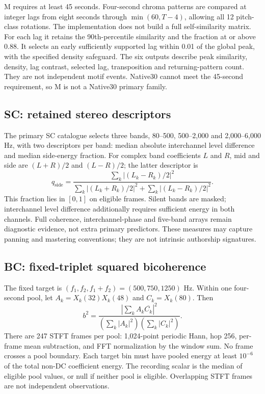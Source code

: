 M requires at least 45 seconds. Four-second chroma patterns are compared
at integer lags from eight seconds through
$\min(60,T-4)$, allowing all 12 pitch-class rotations. The implementation
does not build a full self-similarity matrix. For each lag it retains the
90th-percentile similarity and the fraction at or above 0.88. It selects
an early sufficiently supported lag within 0.01 of the global peak, with
the specified density safeguard. The six outputs describe peak similarity,
density, lag contrast, selected lag, transposition and returning-pattern
count. They are not independent motif events. Native30 cannot meet the
45-second requirement, so M is not a Native30 primary family.

\subsection{SC: retained stereo descriptors}
The primary SC catalogue selects three bands, 80--500, 500--2,000 and
2,000--6,000 Hz, with two descriptors per band: median absolute
interchannel level difference and median side-energy fraction. For complex
band coefficients $L$ and $R$, mid and side are $(L+R)/2$ and $(L-R)/2$;
the latter descriptor is
\begin{equation}
 q_{\mathrm{side}}=
 \frac{\sum_k |(L_k-R_k)/2|^2}
 {\sum_k |(L_k+R_k)/2|^2+\sum_k |(L_k-R_k)/2|^2}.
\end{equation}
This fraction lies in $[0,1]$ on eligible frames. Silent bands are masked;
interchannel level difference additionally requires sufficient energy in
both channels. Full coherence, interchannel-phase and five-band arrays
remain diagnostic evidence, not extra primary predictors. These measures
may capture panning and mastering conventions; they are not intrinsic
authorship signatures.

\subsection{BC: fixed-triplet squared bicoherence}
The fixed target is $(f_1,f_2,f_1+f_2)=(500,750,1250)$ Hz. Within one
four-second pool, let $A_k=X_k(32)X_k(48)$ and $C_k=X_k(80)$. Then
\begin{equation}
 b^2=\frac{|\sum_k A_k\overline{C_k}|^2}
                 {(\sum_k|A_k|^2)(\sum_k|C_k|^2)}.
\end{equation}
There are 247 STFT frames per pool: 1,024-point periodic Hann, hop 256,
per-frame mean subtraction, and FFT normalization by the window sum.
No frame crosses a pool boundary. Each target bin must have pooled energy
at least $10^{-6}$ of the total non-DC coefficient energy. The recording
scalar is the median of eligible pool values, or null if neither pool is
eligible. Overlapping STFT frames are not independent observations.

